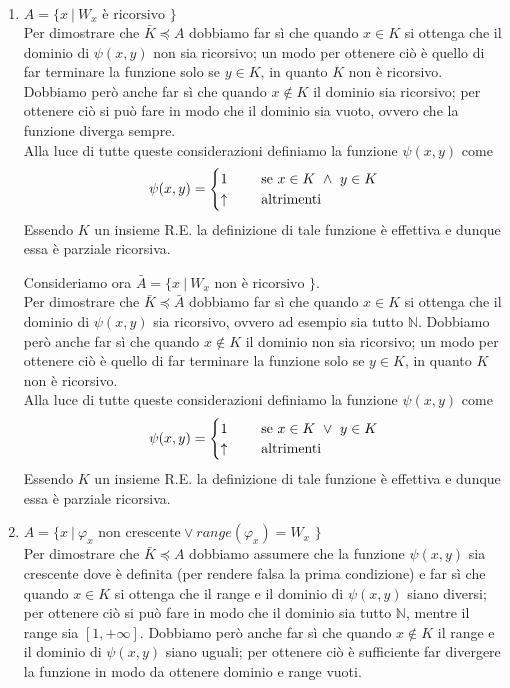 \documentclass[a4paper,oneside,titlepage]{book}
\begin{document}
\begin{enumerate}[label=\fbox{\arabic*}]
\newpage
\item $A = \text{\{ } x \ | \ W_x \text{ è ricorsivo \}}$
\\ Per dimostrare che $\bar{K} \preceq A$ dobbiamo far sì che quando $x \in K$ si ottenga che il dominio di $\psi(x,y)$ non sia ricorsivo; un modo per ottenere ciò è quello di far terminare la funzione solo se $y \in K$, in quanto $K$ non è ricorsivo. Dobbiamo però anche far sì che quando $x \notin K$ il dominio sia ricorsivo; per ottenere ciò si può fare in modo che il dominio sia vuoto, ovvero che la funzione diverga sempre.
\\ Alla luce di tutte queste considerazioni definiamo la funzione $\psi(x,y)$ come
\[
\psi(x,y) =
\begin{cases}
1& \hspace{0.5cm} \text{se } x \in K \ \wedge \ y \in K \\
\uparrow& \hspace{0.5cm} \text{altrimenti}
\end{cases}
\]
Essendo $K$ un insieme R.E. la definizione di tale funzione è effettiva e dunque essa è parziale ricorsiva.

Consideriamo ora $\bar{A} = \text{\{ } x \ | \ W_x \text{ non è ricorsivo \}}$.
\\ Per dimostrare che $\bar{K} \preceq \bar{A}$ dobbiamo far sì che quando $x \in K$ si ottenga che il dominio di $\psi(x,y)$ sia ricorsivo, ovvero ad esempio sia tutto $\mathbb{N}$. Dobbiamo però anche far sì che quando $x \notin K$ il dominio non sia ricorsivo; un modo per ottenere ciò è quello di far terminare la funzione solo se $y \in K$, in quanto $K$ non è ricorsivo.
\\ Alla luce di tutte queste considerazioni definiamo la funzione $\psi(x,y)$ come
\[
\psi(x,y) =
\begin{cases}
1& \hspace{0.5cm} \text{se } x \in K \ \vee \ y \in K \\
\uparrow& \hspace{0.5cm} \text{altrimenti}
\end{cases}
\]
Essendo $K$ un insieme R.E. la definizione di tale funzione è effettiva e dunque essa è parziale ricorsiva.

\item $A = \text{\{ } x \ | \ \varphi_x \text{ non crescente} \vee range(\varphi_x) = W_x \text{ \}}$
\\ Per dimostrare che $\bar{K} \preceq A$ dobbiamo assumere che la funzione $\psi(x,y)$ sia crescente dove è definita (per rendere falsa la prima condizione) e far sì che quando $x \in K$ si ottenga che il range e il dominio di $\psi(x,y)$ siano diversi; per ottenere ciò si può fare in modo che il dominio sia tutto $\mathbb{N}$, mentre il range sia $[1,+\infty]$. Dobbiamo però anche far sì che quando $x \notin K$ il range e il dominio di $\psi(x,y)$ siano uguali; per ottenere ciò è sufficiente far divergere la funzione in modo da ottenere dominio e range vuoti.


\end{enumerate}
\end{document}
